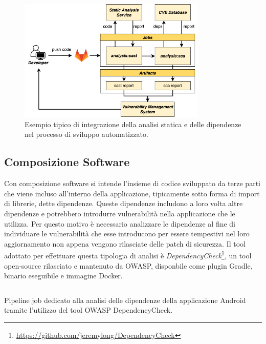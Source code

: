 \begin{figure}[H]
\centering
\includegraphics[width=0.8\textwidth]{img/tesi-12-sastsca.drawio.png}
\caption{Esempio tipico di integrazione della analisi statica e delle dipendenze nel processo di sviluppo automatizzato.}
\end{figure}

\subsection{Composizione Software}
Con composizione software si intende l'insieme di codice sviluppato da terze parti che viene incluso all'interno della applicazione, tipicamente sotto forma di import di librerie, dette dipendenze. Queste dipendenze includono a loro volta altre dipendenze e potrebbero introdurre vulnerabilità nella applicazione che le utilizza. Per questo motivo è necessario analizzare le dipendenze al fine di individuare le vulnerabilità che esse introducono per essere tempestivi nel loro aggiornamento non appena vengono rilasciate delle patch di sicurezza. Il tool adottato per effettuare questa tipologia di analisi è \textit{DependencyCheck}\footnote{\url{https://github.com/jeremylong/DependencyCheck}}, un tool open-source rilasciato e mantenuto da OWASP, disponbile come plugin Gradle, binario eseguibile e immagine Docker.

\begin{listing}[H]
\inputminted{yaml}{code/4-depcheckjob}
\caption{Pipeline job dedicato alla analisi delle dipendenze della applicazione Android tramite l'utilizzo del tool OWASP DependencyCheck.}
\end{listing}

